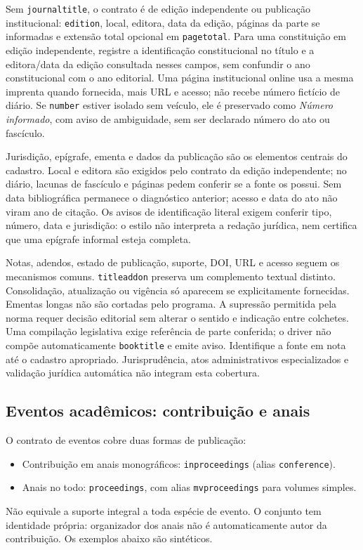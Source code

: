 Sem \texttt{journaltitle}, o contrato é de edição independente ou publicação
institucional: \texttt{edition}, local, editora, data da edição, páginas da parte
se informadas e extensão total opcional em \texttt{pagetotal}. Para uma
constituição em edição independente, registre a identificação constitucional
no título e a editora/data da edição consultada nesses campos, sem confundir
o ano constitucional com o ano editorial. Uma página institucional online
usa a mesma imprenta quando fornecida, mais URL e acesso; não recebe número
fictício de diário. Se \texttt{number} estiver isolado sem veículo, ele é
preservado como \emph{Número informado}, com aviso de ambiguidade, sem ser
declarado número do ato ou fascículo.

Jurisdição, epígrafe, ementa e dados da publicação são os elementos centrais
do cadastro. Local e editora são exigidos pelo contrato da edição independente;
no diário, lacunas de fascículo e páginas pedem conferir se a fonte os possui.
Sem data bibliográfica permanece o diagnóstico anterior; acesso e data do ato
não viram ano de citação. Os avisos de identificação literal exigem conferir
tipo, número, data e jurisdição: o estilo não interpreta a redação jurídica,
nem certifica que uma epígrafe informal esteja completa.

Notas, adendos, estado de publicação, suporte, DOI, URL e acesso seguem os
mecanismos comuns. \texttt{titleaddon} preserva um complemento textual distinto.
Consolidação, atualização ou vigência só aparecem se explicitamente fornecidas.
Ementas longas não são cortadas pelo programa. A supressão permitida pela norma
requer decisão editorial sem alterar o sentido e indicação entre colchetes.
Uma compilação legislativa exige referência de parte conferida; o driver não
compõe automaticamente \texttt{booktitle} e emite aviso. Identifique a fonte
em nota até o cadastro apropriado. Jurisprudência, atos administrativos
especializados e validação jurídica automática não integram esta cobertura.


\subsection*{Eventos acadêmicos: contribuição e anais}

O contrato de eventos cobre duas formas de publicação:
\begin{itemize}
  \item Contribuição em anais monográficos: \texttt{inproceedings}
        (alias \texttt{conference}).
  \item Anais no todo: \texttt{proceedings}, com alias
        \texttt{mvproceedings} para volumes simples.
\end{itemize}
Não equivale a suporte integral a toda espécie de evento. O conjunto tem
identidade própria: organizador dos anais não é automaticamente autor da
contribuição. Os exemplos abaixo são sintéticos.

